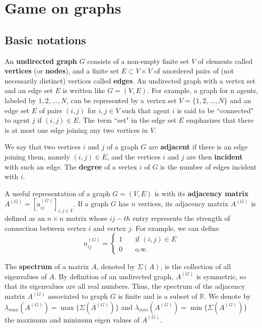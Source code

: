 \section{Game on graphs}

\subsection{Basic notations}

An \textbf{undirected graph} $G$ consists of a non-empty finite set $V$ of elements called \textbf{vertices} (or \textbf{nodes}), and a finite set $E \subset V\times V$ of unordered pairs of (not necessarily distinct) vertices called \textbf{edges}.  An undirected graph with a vertex set and an edge set $E$ is written like $G=(V,E)$. For example, a graph for n agents, labeled by $1,2,\ldots,N$, can be represented by a vertex set $V=\{1,2,\ldots, N \}$ and an edge set $E$ of pairs $(i,j)$ for $i,j \in V$ such that agent $i$ is said to be ``connected" to agent $j$ if $(i,j) \in E$. The term ``set" in the edge set $E$ emphasizes that there is at most one edge joining any two vertices in $V$.

We say that two vertices $i$ and $j$ of a graph $G$ are \textbf{adjacent} if there is an edge joining them, namely $(i,j) \in E$, and the vertices $i$ and $j$ are then \textbf{incident} with such an edge. The \textbf{degree} of a vertex $i$ of $G$ is the number of edges incident with $i$.

A useful representation of a graph $G=(V,E)$ is with its \textbf{adjacency matrix} $A^{(G)} = [a_{ij}^{(G)}]_{i,j \in V}$. If a graph $G$ has $n$ vertices, its adjacency matrix $A^{(G)}$ is defined as an $n \times n$ matrix whose $ij-th$ entry represents the strength of connection between vertex $i$ and vertex $j$. For example, we can define
\begin{equation}
a_{ij}^{(G)} = \left\{
\begin{array}{ll}
1 & \quad \text{if  } (i,j) \in E \\
0 & \quad \text{o.w.}
\end{array}
\right.
\label{eq:adjacency_matrix}
\end{equation}

The \textbf{spectrum} of a matrix $A$, denoted by $\Sigma(A)$, is the collection of all eigenvalues of $A$. By definition of an undirected graph, $A^{(G)}$ is symmetric, so that its eigenvalues are all real numbers.  Thus, the spectrum of the adjacency matrix $A^{(G)}$ associated to graph $G$ is finite and is a subset of $\mathbb{R}$. We denote by 
$\lambda_{max}(A^{(G)}) = \max\{\Sigma(A^{(G)}) \}$ 
and 
$\lambda_{min}(A^{(G)}) = \min\{\Sigma(A^{(G)}) \}$
the maximum and minimum eigen values of $A^{(G)}$.

